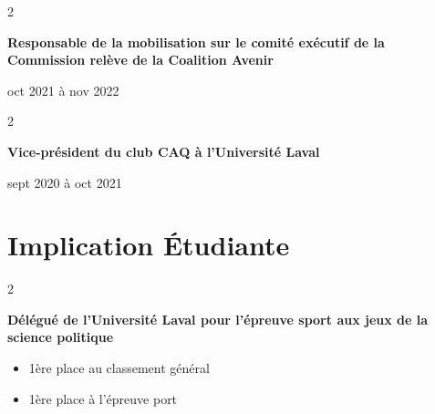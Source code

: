 \documentclass[10pt, letterpaper]{article}
\newenvironment{highlights}{
    \begin{itemize}[
        topsep=0.10 cm,
        parsep=0.10 cm,
        partopsep=0pt,
        itemsep=0pt,
        leftmargin=0.4 cm + 10pt
    ]
}{
    \end{itemize}
} %
\newenvironment{twocolentry}[2][]{
    \onecolentry
    \def\secondColumn{#2}
    \setcolumnwidth{\fill, 4.5 cm}
    \begin{paracol}{2}
}{
    \switchcolumn \raggedleft \secondColumn
    \end{paracol}
    \endonecolentry
} %
\begin{document}
        \begin{samepage}
            \begin{twocolentry}{
                oct 2021 à nov 2022
            }
                \textbf{Responsable de la mobilisation sur le comité exécutif de la Commission relève de la Coalition Avenir}
            \end{twocolentry}


            \vspace{0.10 cm}

            \begin{twocolentry}{
                sept 2020 à oct 2021
            }
                \textbf{Vice-président du club CAQ à l’Université Laval}
            \end{twocolentry}
         
        \end{samepage}

\section{Implication Étudiante }
    
        \begin{samepage}
            \begin{twocolentry}{
                2022
            }
                \textbf{Délégué de l’Université Laval pour l’épreuve sport aux jeux de la science politique}
            \end{twocolentry}
               \begin{highlights}
                \item 1ère place au classement général
                \item 1ère place à l’épreuve port 
                \end{highlights}
                
        \end{samepage}
    
\end{document}
